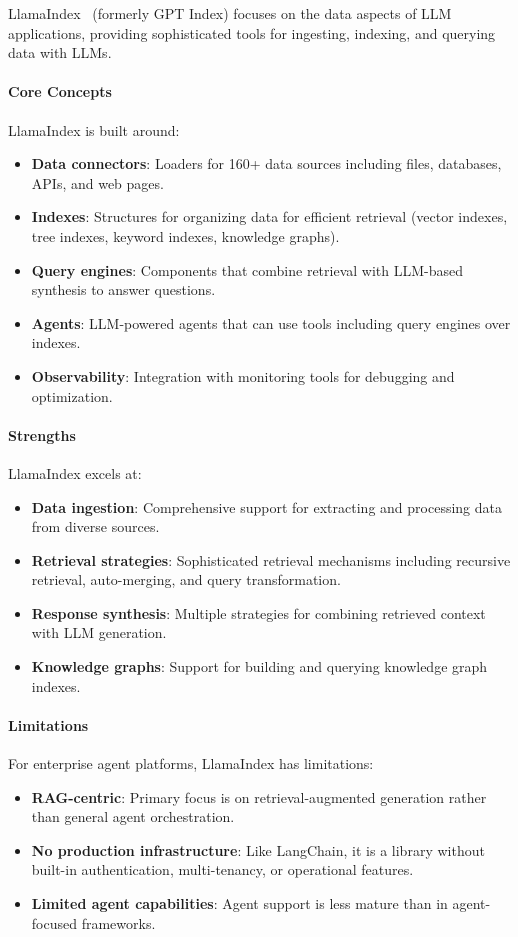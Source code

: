 LlamaIndex~%
(formerly GPT Index) focuses on the data aspects of LLM applications, providing sophisticated tools for ingesting, indexing, and querying data with LLMs.

\paragraph{Core Concepts}
LlamaIndex is built around:
\begin{itemize}
    \item \textbf{Data connectors}: Loaders for 160+ data sources including files, databases, APIs, and web pages.
    \item \textbf{Indexes}: Structures for organizing data for efficient retrieval (vector indexes, tree indexes, keyword indexes, knowledge graphs).
    \item \textbf{Query engines}: Components that combine retrieval with LLM-based synthesis to answer questions.
    \item \textbf{Agents}: LLM-powered agents that can use tools including query engines over indexes.
    \item \textbf{Observability}: Integration with monitoring tools for debugging and optimization.
\end{itemize}

\paragraph{Strengths}
LlamaIndex excels at:
\begin{itemize}
    \item \textbf{Data ingestion}: Comprehensive support for extracting and processing data from diverse sources.
    \item \textbf{Retrieval strategies}: Sophisticated retrieval mechanisms including recursive retrieval, auto-merging, and query transformation.
    \item \textbf{Response synthesis}: Multiple strategies for combining retrieved context with LLM generation.
    \item \textbf{Knowledge graphs}: Support for building and querying knowledge graph indexes.
\end{itemize}

\paragraph{Limitations}
For enterprise agent platforms, LlamaIndex has limitations:
\begin{itemize}
    \item \textbf{RAG-centric}: Primary focus is on retrieval-augmented generation rather than general agent orchestration.
    \item \textbf{No production infrastructure}: Like LangChain, it is a library without built-in authentication, multi-tenancy, or operational features.
    \item \textbf{Limited agent capabilities}: Agent support is less mature than in agent-focused frameworks.
\end{itemize}

